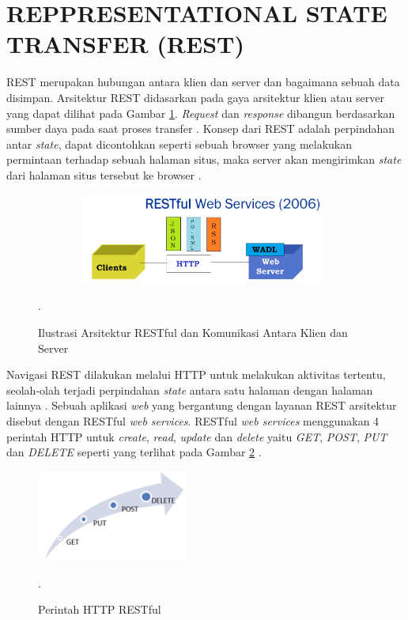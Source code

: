 \section{\uppercase{REpPRESENTATIONAL STATE TRANSFER (REST)}}
REST merupakan hubungan antara klien dan server dan bagaimana sebuah data disimpan. Arsitektur REST didasarkan pada gaya arsitektur klien atau server yang dapat dilihat pada Gambar \ref{restful}. \textit{Request} dan \textit{response} dibangun berdasarkan sumber daya pada saat proses transfer \citep{HaliliRamadani2018}. Konsep dari REST adalah perpindahan antar \textit{state}, dapat dicontohkan seperti sebuah browser yang melakukan permintaan terhadap sebuah halaman situs, maka server akan mengirimkan \textit{state} dari halaman situs tersebut ke browser \citep{Rahman2013}.
\begin{figure}[H]
	\centering
	\shadowbox
	{\includegraphics [width = 11cm, height= 3cm]{gambar/restful}}
	\caption
	{Ilustrasi Arsitektur RESTful dan Komunikasi Antara Klien dan Server \citep{HaliliRamadani2018}}.
	\label{restful}
\end{figure}
\par Navigasi REST dilakukan melalui HTTP untuk melakukan aktivitas tertentu, seolah-olah terjadi perpindahan \textit{state} antara satu halaman dengan halaman lainnya \citep{Rahman2013}. Sebuah aplikasi \textit{web} yang bergantung dengan layanan REST arsitektur disebut dengan RESTful \textit{web services}. RESTful \textit{web services} menggunakan 4 perintah HTTP untuk \textit{create}, \textit{read}, \textit{update} dan \textit{delete} yaitu \textit{GET}, \textit{POST}, \textit{PUT} dan \textit{DELETE} seperti yang terlihat pada Gambar \ref{httprestful} \citep{sinha2014}.
\begin{figure}[H]
	\centering
	\shadowbox
	{\includegraphics [width = 5cm, height= 3cm]{gambar/httprestful}}
	\caption{Perintah HTTP RESTful \citep{sinha2014}}.
	\label{httprestful}
\end{figure}


